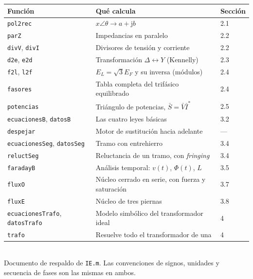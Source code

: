 \documentclass[11pt,a4paper]{article}
\newcommand{\ju}{\mathrm{j}}
\newcommand{\fn}[1]{\texttt{#1}}        %
\begin{document}
\begin{table}[h]
\centering
\small
\begin{tabular}{@{}lL{6.4cm}l@{}}
\toprule
\textbf{Función} & \textbf{Qué calcula} & \textbf{Sección} \\
\midrule
\fn{pol2rec}     & $x\angle\theta \to a + \ju b$ & 2.1 \\
\fn{parZ}        & Impedancias en paralelo & 2.2 \\
\fn{divV}, \fn{divI} & Divisores de tensión y corriente & 2.2 \\
\fn{d2e}, \fn{e2d}   & Transformación $\Delta \leftrightarrow Y$ (Kennelly) & 2.3 \\
\fn{f2l}, \fn{l2f}   & $E_L = \sqrt{3}E_F$ y su inversa (módulos) & 2.4 \\
\fn{fasores}     & Tabla completa del trifásico equilibrado & 2.4 \\
\fn{potencias}   & Triángulo de potencias, $\bar{S} = \bar{V}\bar{I}^{*}$ & 2.5 \\
\midrule
\fn{ecuacionesB}, \fn{datosB} & Las cuatro leyes básicas & 3.2 \\
\fn{despejar}    & Motor de sustitución hacia adelante & --- \\
\fn{ecuacionesSeg}, \fn{datosSeg} & Tramo con entrehierro & 3.4 \\
\fn{reluctSeg}   & Reluctancia de un tramo, con \emph{fringing} & 3.4 \\
\fn{faradayB}    & Análisis temporal: $v(t)$, $\Phi(t)$, $L$ & 3.5 \\
\fn{fluxO}       & Núcleo cerrado en serie, con fuerza y saturación & 3.7 \\
\fn{fluxE}       & Núcleo de tres piernas & 3.8 \\
\midrule
\fn{ecuacionesTrafo}, \fn{datosTrafo} & Modelo simbólico del transformador ideal & 4 \\
\fn{trafo}       & Resuelve todo el transformador de una & 4 \\
\bottomrule
\end{tabular}
\end{table}

\vfill
\noindent\hrulefill\\
\small Documento de respaldo de \fn{IE.m}. Las convenciones de signos, unidades y
secuencia de fases son las mismas en ambos.
\end{document}
